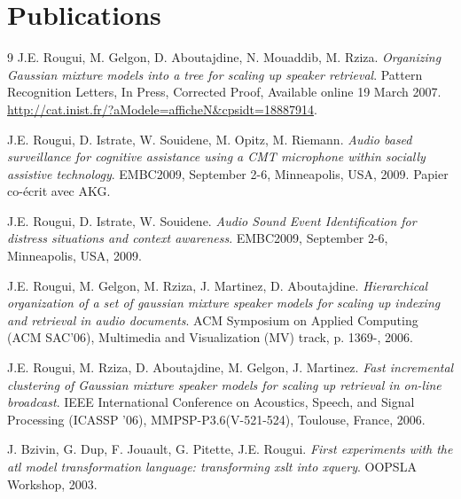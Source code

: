 \documentclass[letterpaper]{twentysecondcv} %
\begin{document}
\section{Publications}
\begin{thebibliography}{9}
	J.E. Rougui, M. Gelgon, D. Aboutajdine, N. Mouaddib, M. Rziza.
	\emph{Organizing Gaussian mixture models into a tree for scaling up speaker retrieval}.
	Pattern Recognition Letters, In Press, Corrected Proof, Available online 19 March 2007.
	\url{http://cat.inist.fr/?aModele=afficheN&cpsidt=18887914}.
	
	J.E. Rougui, D. Istrate, W. Souidene, M. Opitz, M. Riemann.
	\emph{Audio based surveillance for cognitive assistance using a CMT microphone within socially assistive technology}.
	EMBC2009, September 2-6, Minneapolis, USA, 2009.
	Papier co-écrit avec AKG.
	
	J.E. Rougui, D. Istrate, W. Souidene.
	\emph{Audio Sound Event Identification for distress situations and context awareness}.
	EMBC2009, September 2-6, Minneapolis, USA, 2009.
	
	J.E. Rougui, M. Gelgon, M. Rziza, J. Martinez, D. Aboutajdine.
	\emph{Hierarchical organization of a set of gaussian mixture speaker models for scaling up indexing and retrieval in audio documents}.
	ACM Symposium on Applied Computing (ACM SAC'06), Multimedia and Visualization (MV) track, p. 1369-, 2006.
	
	J.E. Rougui, M. Rziza, D. Aboutajdine, M. Gelgon, J. Martinez.
	\emph{Fast incremental clustering of Gaussian mixture speaker models for scaling up retrieval in on-line broadcast}.
	IEEE International Conference on Acoustics, Speech, and Signal Processing (ICASSP '06), MMPSP-P3.6(V-521-524), Toulouse, France, 2006.
	
	J. Bzivin, G. Dup, F. Jouault, G. Pitette, J.E. Rougui.
	\emph{First experiments with the atl model transformation language: transforming xslt into xquery}. OOPSLA Workshop, 2003.

\end{thebibliography}
\end{document}
